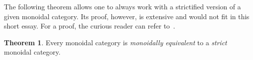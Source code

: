 \documentclass[11pt, reqno]{amsart}
\theoremstyle{definition}
\newtheorem{theorem}{Theorem}[section]
\newcommand{\iso}{\simeq}
\newcommand{\arrowiso}{\iso}
\newcommand{\nat}{\Rightarrow}
\newcommand{\isonat}{\xRightarrow{\raisebox{-.6ex}[0ex][0ex]{\(\arrowiso\)}}}
\newcommand{\cat}{\texttt}
\DeclareMathOperator{\Id}{id}     %
\begin{document}
The following theorem allows one to always work with a strictified version of a
given monoidal category. Its proof, however, is extensive and would not fit in
this short essay. For a proof, the curious reader can refer to~\cite{geiger}.

\begin{theorem}
\label{thm:strictification-mon-cat}
Every monoidal category is \emph{monoidally equivalent} to a \emph{strict}
monoidal category.
\end{theorem}


\end{document}
